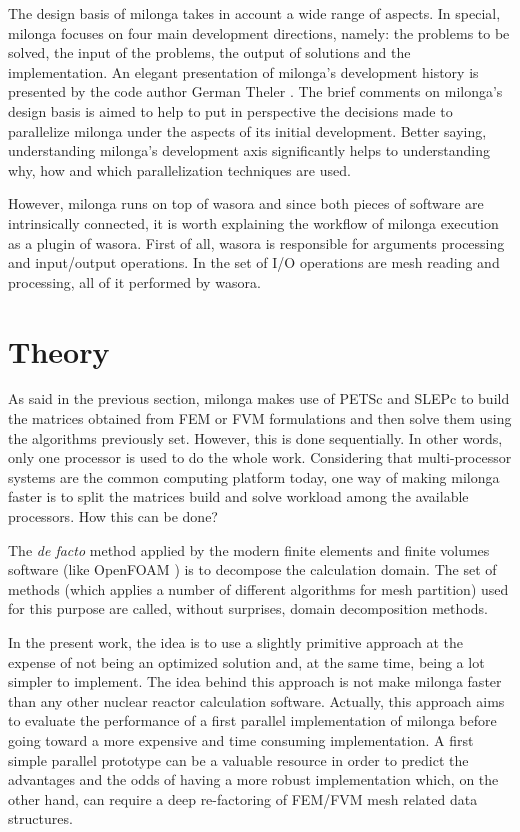 \documentclass{anstrans}
\begin{document}

The design basis of milonga takes in account a wide range of aspects. 
In special, milonga focuses on four main development directions, namely:
the problems to be solved, the input of the problems, the 
output of solutions and the implementation. An elegant presentation 
of milonga's development history is presented by the code author 
German Theler \cite{Theler2014}. The brief comments on milonga's 
design basis is aimed to help to put in perspective the decisions 
made to parallelize milonga under the aspects of its initial development.
Better saying, understanding milonga's development 
axis significantly helps to understanding why, how and which parallelization techniques are used.

However, milonga runs on top of wasora and since both pieces of software 
are intrinsically connected, it is worth explaining the workflow of milonga 
execution as a plugin of wasora. First of all, wasora is responsible for 
arguments processing and input/output operations. In the set of I/O operations 
are mesh reading and processing, all of it performed by wasora. 

\section{Theory}

As said in the previous section, milonga makes use of PETSc and SLEPc to
build the matrices obtained from FEM or FVM formulations and then solve
them using the algorithms previously set. However, this is done sequentially.
In other words, only one processor is used to do the whole work. Considering
that multi-processor systems are the common computing platform today, one
way of making milonga faster is to split the matrices build and solve workload
among the available processors. How this can be done?

The \textit{de facto} method applied by the modern finite elements and
finite volumes software (like OpenFOAM \cite{OpenFOAM}) is to decompose
the calculation domain. The set of methods (which applies a number of
different algorithms for mesh partition) used for this purpose are
called, without surprises, domain decomposition methods.

In the present work, the idea is to use a slightly primitive approach at
the expense of not being an optimized solution and, at the same time,
being a lot simpler to implement. The idea behind this approach is not make
milonga faster than any other nuclear reactor calculation software.
Actually, this approach aims to evaluate the performance of a first
parallel implementation of milonga before going toward a more expensive
and time consuming implementation. A first simple parallel prototype can be
a valuable resource in order to predict the advantages and the odds of having
a more robust implementation which, on the other hand, can require a deep
re-factoring of FEM/FVM mesh related data structures.
\end{document}
